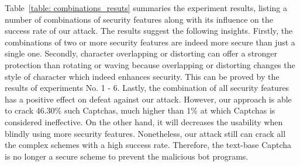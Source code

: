 Table~\ref{table: combinations_resuts} summaries the experiment results, listing a number of combinations of security features along with its influence on the success rate of our attack.
The results suggest the following insights.  Firstly, the combinations of two or more security features are indeed more secure than just a single one. Secondly, character overlapping or distorting can offer a stronger protection than rotating or waving because overlapping or distorting changes the style of character which indeed enhances security. This can be proved by the results of experiments No. 1 - 6. Lastly, the combination of all security features has a positive effect on defeat against our attack. However, our approach is able to crack 46.30\% such Captchas, much higher than 1\% at which Captchas is considered ineffective. On the other hand, it will decreases the usability when blindly using more security features. Nonetheless, our attack still can crack all the complex schemes with a high success rate. Therefore, the text-base Captcha is no longer a secure scheme to prevent the malicious bot programs.
